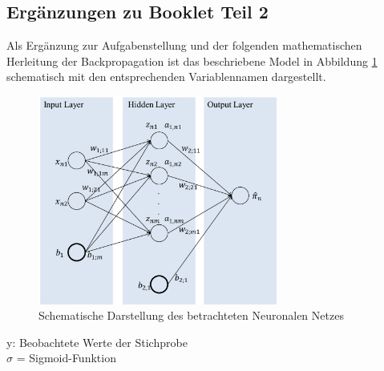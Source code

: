 \subsection{Ergänzungen zu Booklet Teil 2} \label{app:ergaenzung_booklet_2}
Als Ergänzung zur Aufgabenstellung und der folgenden mathematischen Herleitung der Backpropagation ist das beschriebene Model in Abbildung \ref{fig:nn_schema} schematisch mit den entsprechenden Variablennamen dargestellt.
\begin{figure}[H]
	\centering
	\includegraphics[width = 0.7\textwidth]{Bilder/neuralNetwork.png}
	\caption{Schematische Darstellung des betrachteten Neuronalen Netzes}
	\label{fig:nn_schema}
\end{figure}
y: Beobachtete Werte der Stichprobe\\
$\sigma$ = Sigmoid-Funktion\\
